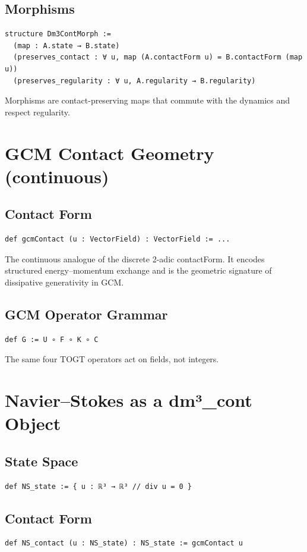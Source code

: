 \documentclass[11pt,a4paper]{article}
\begin{document}
\subsection{Morphisms}
\begin{lstlisting}
structure Dm3ContMorph :=
  (map : A.state → B.state)
  (preserves_contact : ∀ u, map (A.contactForm u) = B.contactForm (map u))
  (preserves_regularity : ∀ u, A.regularity → B.regularity)
\end{lstlisting}
Morphisms are contact-preserving maps that commute with the dynamics and respect regularity.

\section{GCM Contact Geometry (continuous)}

\subsection{Contact Form}
\begin{lstlisting}
def gcmContact (u : VectorField) : VectorField := ...
\end{lstlisting}
The continuous analogue of the discrete 2-adic contactForm. It encodes structured energy–momentum exchange and is the geometric signature of dissipative generativity in GCM.

\subsection{GCM Operator Grammar}
\begin{lstlisting}
def G := U ∘ F ∘ K ∘ C
\end{lstlisting}
The same four TOGT operators act on fields, not integers.

\section{Navier–Stokes as a dm³\_cont Object}

\subsection{State Space}
\begin{lstlisting}
def NS_state := { u : ℝ³ → ℝ³ // div u = 0 }
\end{lstlisting}

\subsection{Contact Form}
\begin{lstlisting}
def NS_contact (u : NS_state) : NS_state := gcmContact u
\end{lstlisting}
\end{document}
